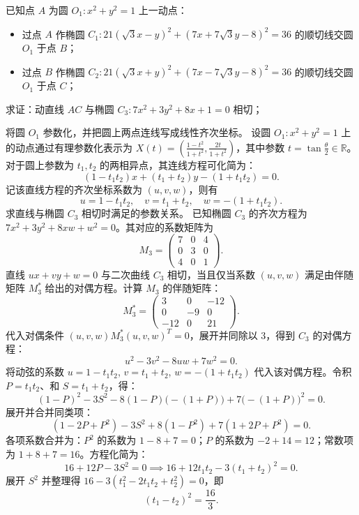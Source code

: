 \begin{example}
    已知点 \(A\) 为圆 \(O_1: x^2 + y^2 = 1\) 上一动点：
\begin{itemize}
\item 过点 \(A\) 作椭圆 \(C_1: 21(\sqrt{3}x - y)^2 + (7x + 7\sqrt{3}y - 8)^2 = 36\) 的顺切线交圆 \(O_1\) 于点 \(B\)；
\item 过点 \(B\) 作椭圆 \(C_2: 21(\sqrt{3}x + y)^2 + (7x - 7\sqrt{3}y - 8)^2 = 36\) 的顺切线交圆 \(O_1\) 于点 \(C\)；
\end{itemize}
求证：动直线 \(AC\) 与椭圆 \(C_3: 7x^2 + 3y^2 + 8x + 1 = 0\) 相切；
\end{example}
\begin{solution}
将圆 $O_1$ 参数化，并把圆上两点连线写成线性齐次坐标。
设圆 $O_1: x^2 + y^2 = 1$ 上的动点通过有理参数化表示为 $X(t) = \left( \frac{1-t^2}{1+t^2}, \frac{2t}{1+t^2} \right)$，其中参数 $t = \tan\frac{\theta}{2} \in \mathbb{R}$。
对于圆上参数为 $t_1, t_2$ 的两相异点，其连线方程可化简为：
\[ (1 - t_1 t_2)x + (t_1 + t_2)y - (1 + t_1 t_2) = 0. \]
记该直线方程的齐次坐标系数为 $(u, v, w)$，则有
\[ u = 1 - t_1 t_2, \quad v = t_1 + t_2, \quad w = -(1 + t_1 t_2). \]
求直线与椭圆 $C_3$ 相切时满足的参数关系。
已知椭圆 $C_3$ 的齐次方程为 $7x^2 + 3y^2 + 8xw + w^2 = 0$。其对应的系数矩阵为
\[ M_3 = \begin{pmatrix} 7 & 0 & 4 \\ 0 & 3 & 0 \\ 4 & 0 & 1 \end{pmatrix}. \]
直线 $ux + vy + w = 0$ 与二次曲线 $C_3$ 相切，当且仅当系数 $(u,v,w)$ 满足由伴随矩阵 $M_3^*$ 给出的对偶方程。计算 $M_3$ 的伴随矩阵：
\[ M_3^* = \begin{pmatrix} 3 & 0 & -12 \\ 0 & -9 & 0 \\ -12 & 0 & 21 \end{pmatrix}. \]
代入对偶条件 $(u, v, w) M_3^* (u, v, w)^T = 0$，展开并同除以 $3$，得到 $C_3$ 的对偶方程：
\[ u^2 - 3v^2 - 8uw + 7w^2 = 0. \]
将动弦的系数 $u = 1 - t_1 t_2$, $v = t_1 + t_2$, $w = -(1 + t_1 t_2)$ 代入该对偶方程。令积 $P = t_1 t_2$、和 $S = t_1 + t_2$，得：
\[ (1 - P)^2 - 3S^2 - 8(1 - P)\big(-(1 + P)\big) + 7\big(-(1 + P)\big)^2 = 0. \]
展开并合并同类项：
\[ (1 - 2P + P^2) - 3S^2 + 8(1 - P^2) + 7(1 + 2P + P^2) = 0. \]
各项系数合并为：$P^2$ 的系数为 $1 - 8 + 7 = 0$；$P$ 的系数为 $-2 + 14 = 12$；常数项为 $1 + 8 + 7 = 16$。方程化简为：
\[ 16 + 12P - 3S^2 = 0 \implies 16 + 12t_1 t_2 - 3(t_1 + t_2)^2 = 0. \]
展开 $S^2$ 并整理得 $16 - 3(t_1^2 - 2t_1 t_2 + t_2^2) = 0$，即
\[ (t_1 - t_2)^2 = \frac{16}{3}. \]

\end{solution}
